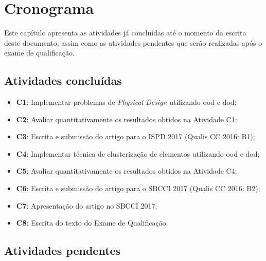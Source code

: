 \chapter{Cronograma}
\label{cap:cronograma}

Este capítulo apresenta as atividades já concluídas até o momento da escrita deste documento, assim como as atividades pendentes que serão realizadas após o exame de qualificação.

\section{Atividades concluídas}

\begin{itemize}
    \item \textbf{C1}: Implementar problemas de \textit{Physical Design} utilizando \ac{ood} e \ac{dod};
    \item \textbf{C2}: Avaliar quantitativamente os resultados obtidos na Atividade C1;
    \item \textbf{C3}: Escrita e submissão do artigo para o ISPD 2017 (Qualis  CC 2016: B1);
    \item \textbf{C4}: Implementar técnica de clusterização de elementos utilizando \ac{ood} e \ac{dod};
    \item \textbf{C5}: Avaliar quantitativamente os resultados obtidos na Atividade C4;
    \item \textbf{C6}: Escrita e submissão do artigo para o SBCCI 2017 (Qualis  CC 2016: B2);
    \item \textbf{C7}: Apresentação do artigo no SBCCI 2017;
    \item \textbf{C8}: Escrita do texto do Exame de Qualificação.
\end{itemize}

\section{Atividades pendentes}

